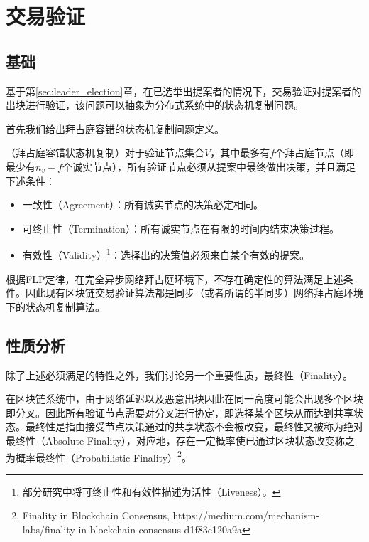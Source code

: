 \section{交易验证}
\label{sec:tx_verification}
\subsection{基础}
基于第\ref{sec:leader_election}章，在已选举出提案者的情况下，交易验证对提案者的出块进行验证，该问题可以抽象为分布式系统中的状态机复制问题\cite{pass2017rethinking}。



首先我们给出拜占庭容错的状态机复制问题定义。
\begin{definition}
（拜占庭容错状态机复制）对于验证节点集合$V$，其中最多有$f$个拜占庭节点（即最少有$n_v-f$个诚实节点），所有验证节点必须从提案中最终做出决策，并且满足下述条件：
\begin{itemize}
	\item 一致性（Agreement）：所有诚实节点的决策必定相同。
	\item 可终止性（Termination）：所有诚实节点在有限的时间内结束决策过程。
	\item 有效性（Validity）\footnote{部分研究中将可终止性和有效性描述为活性（Liveness）。}：选择出的决策值必须来自某个有效的提案。
\end{itemize}
\end{definition}

根据FLP定律，在完全异步网络拜占庭环境下，不存在确定性的算法满足上述条件\cite{fischer1982impossibility}。因此现有区块链交易验证算法都是同步（或者所谓的半同步）网络拜占庭环境下的状态机复制算法\cite{gilad2017algorand,castro1999practical}。

\subsection{性质分析}
除了上述必须满足的特性之外，我们讨论另一个重要性质，最终性（Finality）。

在区块链系统中，由于网络延迟以及恶意出块因此在同一高度可能会出现多个区块即分叉。因此所有验证节点需要对分叉进行协定，即选择某个区块从而达到共享状态。最终性是指由接受节点决策通过的共享状态不会被改变，最终性又被称为绝对最终性（Absolute Finality），对应地，存在一定概率使已通过区块状态改变称之为概率最终性（Probabilistic Finality）\footnote{Finality in Blockchain Consensus, https://medium.com/mechanism-labs/finality-in-blockchain-consensus-d1f83c120a9a}。


